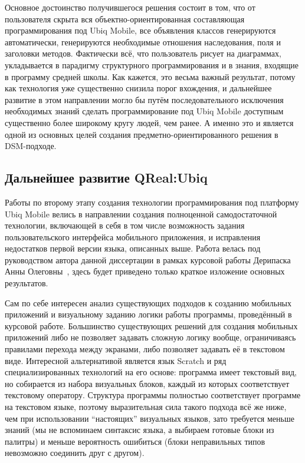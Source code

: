 Основное достоинство получившегося решения состоит в том, что от пользователя скрыта 
вся объектно-ориентированная составляющая программирования под Ubiq Mobile, все объявления 
классов генерируются автоматически, генерируются необходимые отношения наследования, 
поля и заголовки методов. Фактически всё, что пользователь рисует на диаграммах, укладывается 
в парадигму структурного программирования и в знания, входящие в программу средней 
школы. Как кажется, это весьма важный результат, потому как технология уже существенно 
снизила порог вхождения, и дальнейшее развитие в этом направлении могло бы путём последовательного 
исключения необходимых знаний сделать программирование под Ubiq Mobile доступным существенно 
более широкому кругу людей, чем ранее. А именно это и является одной из основных целей 
создания предметно-ориентированного решения в \ac{DSM}-подходе.

\subsection{Дальнейшее развитие QReal:Ubiq}
\label{chapter:advancedQRealUbiq}
Работы по второму этапу создания технологии программирования под платформу Ubiq Mobile 
велись в направлении создания полноценной самодостаточной технологии, включающей в себя 
в том числе возможность задания пользовательского интерфейса мобильного приложения, 
и исправления недостатков первой версии языка, описанных выше. Работа велась под руководством 
автора данной диссертации в рамках курсовой работы Дерипаска Анны Олеговны~\cite{deripaska2013course}, 
здесь будет приведено только краткое изложение основных результатов.

Сам по себе интересен анализ существующих подходов к созданию мобильных приложений 
и визуальному заданию логики работы программы, проведённый в курсовой работе. Большинство 
существующих решений для создания мобильных приложений либо не позволяет задавать 
сложную логику вообще, ограничиваясь правилами перехода между экранами, либо позволяет 
задавать её в текстовом виде. Интересной альтернативой является язык Scratch и ряд 
специализированных технологий на его основе: программа имеет текстовый вид, но собирается 
из набора визуальных блоков, каждый из которых соответствует текстовому оператору. 
Структура программы полностью соответствует программе на текстовом языке, поэтому 
выразительная сила такого подхода всё же ниже, чем при использовании "`настоящих"' 
визуальных языков, зато требуется меньше знаний (мы не вспоминаем синтаксис языка, 
а выбираем готовые блоки из палитры) и меньше вероятность ошибиться (блоки неправильных 
типов невозможно соединить друг с другом).

